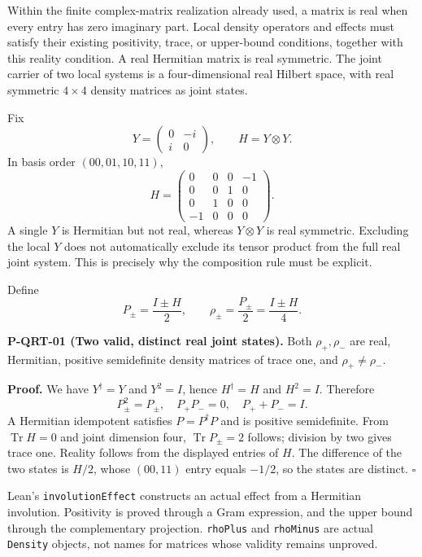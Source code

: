 \documentclass[
  11pt,
  oneside]{book}
\begin{document}
Within the finite complex-matrix realization already used, a matrix is
real when every entry has zero imaginary part. Local density operators
and effects must satisfy their existing positivity, trace, or
upper-bound conditions, together with this reality condition. A real
Hermitian matrix is real symmetric. The joint carrier of two local
systems is a four-dimensional real Hilbert space, with real symmetric
\(4\times4\) density matrices as joint states.

Fix \[
Y=\begin{pmatrix}0&-i\\i&0\end{pmatrix},\qquad H=Y\otimes Y.
\] In basis order \((00,01,10,11)\), \[
H=\begin{pmatrix}
0&0&0&-1\\
0&0&1&0\\
0&1&0&0\\
-1&0&0&0
\end{pmatrix}.
\] A single \(Y\) is Hermitian but not real, whereas \(Y\otimes Y\) is
real symmetric. Excluding the local \(Y\) does not automatically exclude
its tensor product from the full real joint system. This is precisely
why the composition rule must be explicit.

Define \[
P_\pm=\frac{I\pm H}{2},\qquad
\rho_\pm=\frac{P_\pm}{2}=\frac{I\pm H}{4}.
\]

\label{p-qrt-01}{}

\textbf{P-QRT-01 (Two valid, distinct real joint states).} Both
\(\rho_+,\rho_-\) are real, Hermitian, positive semidefinite density
matrices of trace one, and \(\rho_+\ne\rho_-\).

\textbf{Proof.} We have \(Y^\dagger=Y\) and \(Y^2=I\), hence
\(H^\dagger=H\) and \(H^2=I\). Therefore \[
P_\pm^2=P_\pm,\quad P_+P_-=0,\quad P_++P_-=I.
\] A Hermitian idempotent satisfies \(P=P^\dagger P\) and is positive
semidefinite. From \(\operatorname{Tr}H=0\) and joint dimension four,
\(\operatorname{Tr}P_\pm=2\) follows; division by two gives trace one.
Reality follows from the displayed entries of \(H\). The difference of
the two states is \(H/2\), whose \((00,11)\) entry equals \(-1/2\), so
the states are distinct. \(\square\)

Lean's \texttt{involution\allowbreak Effect} constructs an actual effect from a
Hermitian involution. Positivity is proved through a Gram expression,
and the upper bound through the complementary projection.
\texttt{rho\allowbreak Plus} and \texttt{rho\allowbreak Minus} are actual \texttt{Density}
objects, not names for matrices whose validity remains unproved.
\end{document}
